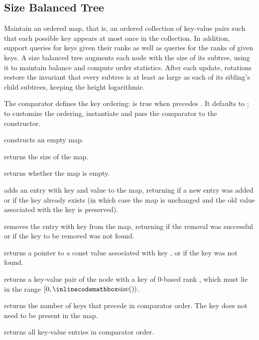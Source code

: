 \subsection{Size Balanced Tree}
\label{sec:2.4.5}
Maintain an ordered map, that is, an ordered collection of key-value pairs such that each possible key appears at most once in the collection. In addition, support queries for keys given their ranks as well as queries for the ranks of given keys. A size balanced tree augments each node with the size of its subtree, using it to maintain balance and compute order statistics. After each update, rotations restore the invariant that every subtree is at least as large as each of its sibling's child subtrees, keeping the height logarithmic.

The comparator  defines the key ordering:  is true when  precedes . It defaults to ; to customize the ordering, instantiate  and pass the comparator to the constructor.

\begin{compactitem}
  \item {} constructs an empty map.
  \item {} returns the size of the map.
  \item {} returns whether the map is empty.
  \item {} adds an entry with key  and value  to the map, returning  if a new entry was added or  if the key already exists (in which case the map is unchanged and the old value associated with the key is preserved).
  \item {} removes the entry with key  from the map, returning  if the removal was successful or  if the key to be removed was not found.
  \item {} returns a pointer to a const value associated with key , or  if the key was not found.
  \item {} returns a key-value pair of the node with a key of 0-based rank , which must lie in the range $[0, {\inlinecodemath{size()}})$.
  \item {} returns the number of keys that precede  in comparator order. The key does not need to be present in the map.
  \item {} returns all key-value entries in comparator order.
\end{compactitem}

